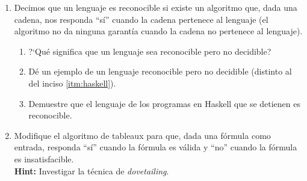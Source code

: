\documentclass{article}
\begin{document}
\begin{enumerate}
  
\item Decimos que un lenguaje es reconocible si existe un
  algoritmo que, dada una cadena, nos responda ``s\'i'' cuando la
  cadena pertenece al lenguaje (el algoritmo no da ninguna garant\'ia cuando la
  cadena no pertenece al lenguaje).
  \begin{enumerate}
  \item ?`Qu\'e significa que un lenguaje sea reconocible pero no decidible?
  \item D\'e un ejemplo de un lenguaje reconocible pero no decidible (distinto
    al del inciso \ref{itm:haskell}).
  \item \label{itm:haskell} Demuestre que el lenguaje de los programas en Haskell que se detienen es reconocible.
  \end{enumerate}

\item Modifique el algoritmo de tableaux para que, dada una f\'ormula como
  entrada, responda ``s\'i'' cuando la f\'ormula es v\'alida y ``no'' cuando la
  f\'ormula es insatisfacible.\\
  \textbf{Hint:} Investigar la t\'ecnica de \textit{dovetailing}.
  
\end{enumerate}
\end{document}
